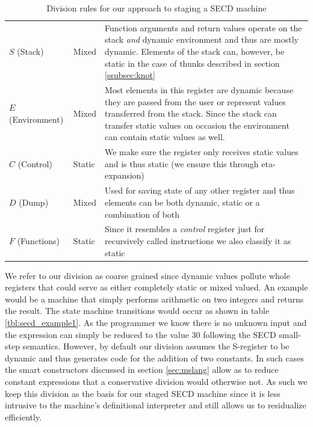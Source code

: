 \documentclass[a4paper,12pt,twoside,openright]{report}
\theoremstyle{definition}
\begin{document}
\begin{table}[!htbp]
  \centering
  \begin{tabular}{|p{3cm}|p{3cm}|p{6cm}|}
 	\hline
 	\thead{SECD Register}	&	\thead{Classification}	&	\thead{Reason}	\\ \hline
	$S$ (Stack)				&	Mixed				&	Function arguments and return values operate on the stack \textit{and} dynamic environment and thus are mostly dynamic. Elements of the stack can, however, be static in the case of thunks described in section \ref{ssubsec:knot} \\ \hline

	$E$ (Environment)		&	Mixed			&	 Most elements in this register are dynamic because they are passed from the user or represent values transferred from the stack. Since the stack can transfer static values on occasion the environment can contain static values as well. \\ \hline

	$C$ (Control)				&	Static				& We make sure the register only receives static values and is thus static (we ensure this through eta-expansion)  \\ \hline

	$D$ (Dump)				&	Mixed				&	Used for saving state of any other register and thus elements can be both dynamic, static or a combination of both \\ \hline

	$F$ (Functions)		&	Static				&	Since it resembles a \textit{control} register just for recursively called instructions we also classify it as static \\

	\hline
  \end{tabular}
  \caption{Division rules for our approach to staging a SECD machine}
  \label{tbl:secd_division}
\end{table}

We refer to our division as coarse grained since dynamic values pollute whole registers that could serve as either completely static or mixed valued. An example would be a machine that simply performs arithmetic on two integers and returns the result. The state machine transitions would occur as shown in table \ref{tbl:secd_example1}. As the programmer we know there is no unknown input and the expression can simply be reduced to the value 30 following the SECD small-step semantics. However, by default our division assumes the S-register to be dynamic and thus generates code for the addition of two constants. In such cases the smart constructors discussed in section \ref{sec:mslang} allow as to reduce constant expressions that a conservative division would otherwise not. As such we keep this division as the basis for our staged SECD machine since it is less intrusive to the machine's definitional interpreter and still allows us to residualize efficiently.
\end{document}

